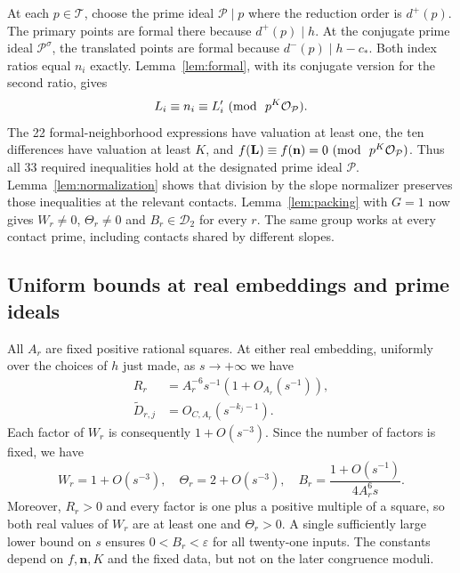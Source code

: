 \documentclass[11pt,reqno]{amsart}
\theoremstyle{definition}
\numberwithin{equation}{section}
\newcommand{\OO}{\mathcal O}
\def\mo{{\rm{mod}\ }}
\def\pmod#1{\ (\mo\ #1)}
\begin{document}
At each $p\in\mathcal T$, choose the prime ideal $\mathcal P\mid p$ where the reduction order is $d^+(p)$. The primary points are formal there because $d^+(p)\mid h$. At the conjugate prime ideal $\mathcal P^\sigma$, the translated points are formal because $d^-(p)\mid h-c_\ast$. Both index ratios equal $n_i$ exactly. Lemma~\ref{lem:formal}, with its conjugate version for the second ratio, gives
\[
 L_i\equiv n_i\equiv L'_i\pmod{p^K\OO_{\mathcal P}}.
\]
The 22 formal-neighborhood expressions have valuation at least one, the ten differences have valuation at least $K$, and $f(\mathbf L)\equiv f(\mathbf n)=0\pmod{p^K\OO_{\mathcal P}}$. Thus all 33 required inequalities hold at the designated prime ideal $\mathcal P$. Lemma~\ref{lem:normalization} shows that division by the slope normalizer preserves those inequalities at the relevant contacts. Lemma~\ref{lem:packing} with $G=1$ now gives $W_r\ne0$, $\Theta_r\ne0$ and $B_r\in\mathcal D_2$ for every $r$. The same group works at every contact prime, including contacts shared by different slopes.

\subsection{Uniform bounds at real embeddings and prime ideals}
All $A_r$ are fixed positive rational squares. At either real embedding, uniformly over the choices of $h$ just made, as $s\to+\infty$ we have
\begin{align}
 R_r&=A_r^{-6}s^{-1}(1+O_{A_r}(s^{-1})),\label{eq:realR}\\
 \widetilde D_{r,j}&=O_{C,A_r}(s^{-k_j-1}).\label{eq:realD}
\end{align}
Each factor of $W_r$ is consequently $1+O(s^{-3})$. Since the number of factors is fixed, we have
\begin{equation}\label{eq:realB}
 W_r=1+O(s^{-3}),\quad \Theta_r=2+O(s^{-3}),\quad
 B_r=\frac{1+O(s^{-1})}{4A_r^6s}.
\end{equation}
Moreover, $R_r>0$ and every factor is one plus a positive multiple of a square, so both real values of $W_r$ are at least one and $\Theta_r>0$. A single sufficiently large lower bound on $s$ ensures $0<B_r<\varepsilon$ for all twenty-one inputs. The constants depend on $f,\mathbf n,K$ and the fixed data, but not on the later congruence moduli.
\end{document}
